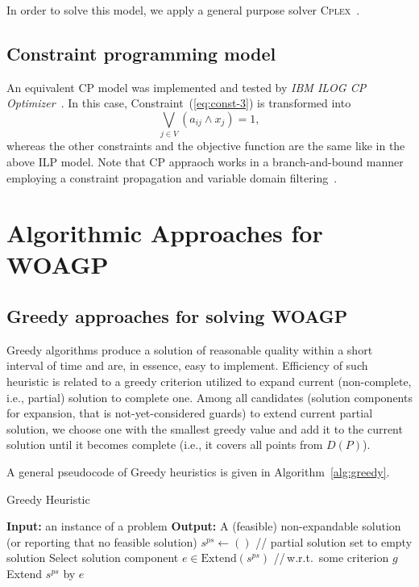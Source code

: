 \documentclass[runningheads,a4paper]{elsarticle}
\begin{document}
	In order to solve this model, we apply a general purpose solver \textsc{Cplex}~\cite{lima2010ibm}.
	\subsection{Constraint programming model} An equivalent CP model was implemented and tested by \textit{IBM ILOG CP Optimizer}~\cite{laborie2018ibm}. In this case,  Constraint~(\ref{eq:const-3}) is transformed into
	\begin{equation}
	\bigvee_{ j \in V } (a_{ij} \wedge x_j) = 1,
	\end{equation}
	whereas the other constraints and the objective function are the same like in the above ILP model. Note that CP appraoch works in a branch-and-bound manner employing a constraint propagation and variable domain filtering~\cite{rossi2006handbook}.
	\section{Algorithmic Approaches for WOAGP}
	\subsection{Greedy approaches for solving WOAGP}
 Greedy algorithms produce a solution of reasonable quality within a short interval of time and are, in essence, easy to implement. Efficiency of such  heuristic is related to a greedy criterion utilized to expand current (non-complete, i.e., partial) solution to complete one. Among all candidates (solution components for expansion, that is not-yet-considered guards) to extend current partial solution,  we choose one with the smallest greedy value and add it to the current solution until it becomes complete (i.e., it covers all  points from $D(P)$).
	
	A general pseudocode of Greedy heuristics is given in Algorithm~\ref{alg:greedy}.
	
	\begin{algorithm}[!t]
		\caption{Greedy Heuristic}\label{alg:greedy}
		\begin{algorithmic}[1]
			\State \textbf{Input:} an instance of a problem
			\State \textbf{Output:} A (feasible) non-expandable solution (or reporting that no feasible solution)
			\State $s^{ps} \gets ()$ \hspace{0.3cm}// partial solution set to empty solution
			\State Select solution component $e \in  \text{Extend}(s^{ps})$ \hspace{0.3cm}//\,w.r.t.\  some criterion $g$
			\State Extend $s^{ps}$ by $e$
			\EndWhile
		\end{algorithmic}
	\end{algorithm}
\end{document}
